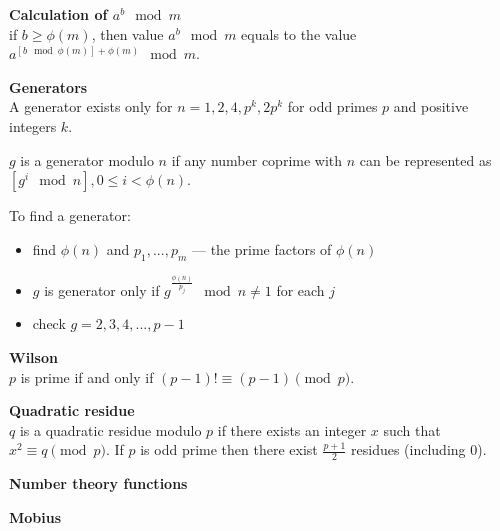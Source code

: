 \textbf{Calculation of $a^b \mod m$}\\
if $b \ge \phi(m)$, then value $a^b \mod m$ equals to the value $a^{\left[b \mod \phi(m)\right] + \phi(m)} \mod m$.

\textbf{Generators}\\
A generator exists only for $n = 1, 2, 4, p^k, 2p^k$ for odd primes $p$ and positive integers $k$. 

$g$ is a generator modulo $n$ if any number coprime with $n$ can be represented as $\left[ g^i \mod n \right], 0 \le i < \phi(n)$.

To find a generator:
\begin{itemize}
\item find $\phi(n)$ and $p_1, ..., p_m$ --- the prime factors of $\phi(n)$
\item $g$ is generator only if $g^{\frac{\phi(n)}{p_j}} \mod n \ne 1$ for each $j$
\item check $g = 2, 3, 4, ..., p - 1$
\end{itemize}

\textbf{Wilson}\\
$p$ is prime if and only if $(p - 1)! \equiv (p - 1) \pmod p$.

\textbf{Quadratic residue}\\
$q$ is a quadratic residue modulo $p$ if there exists an integer $x$ such that $x^2 \equiv q \pmod p$.
If $p$ is odd prime then there exist $\frac{p + 1}{2}$ residues (including 0).

\textbf{Number theory functions}

\textbf{Mobius}
